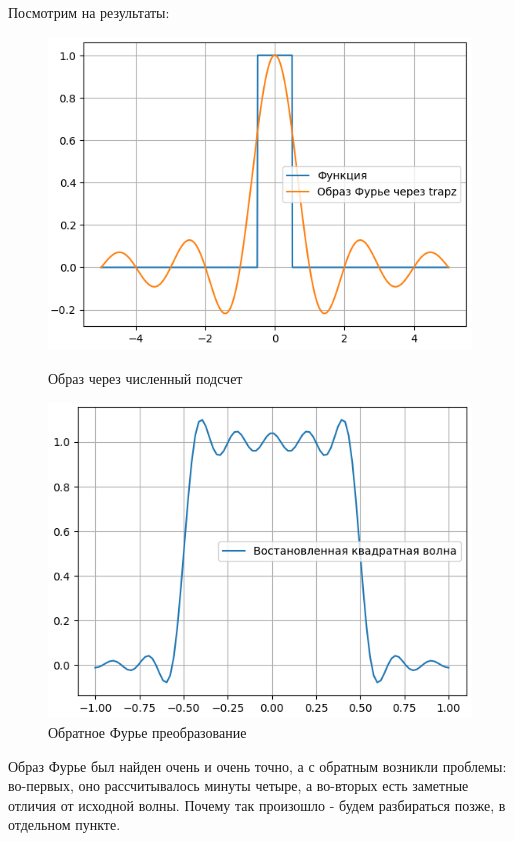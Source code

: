 \noindent Посмотрим на результаты: 

\begin{figure}[!htb]
    \includegraphics[width=\linewidth]{../img/2}
    \caption{Образ через численный подсчет}
    \endminipage\hfill
    \includegraphics[width=\linewidth]{../img/3}   
    \caption{Обратное Фурье преобразование}
    \endminipage\hfill
\end{figure}
\noindent Образ Фурье был найден очень и очень точно, а с обратным возникли проблемы: во-первых, оно рассчитывалось минуты четыре, а во-вторых есть заметные отличия от исходной волны. Почему так произошло - будем разбираться позже, в отдельном пункте.
\newpage
